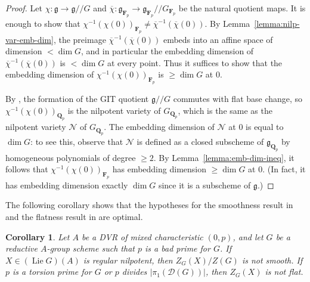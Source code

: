 \documentclass[11pt,reqno]{amsart}
\newtheorem{cor}[theorem]{Corollary}
\theoremstyle{definition}
\newcommand{\bF}{{\mathbf F}}
\newcommand{\bQ}{{\mathbf Q}}
\newcommand{\sD}{{\mathscr D}}
\newcommand{\sN}{{\mathscr N}}
\newcommand{\fg}{\mathfrak{g}}
\DeclareMathOperator{\Lie}{Lie}
\begin{document}
\begin{proof}
    Let $\chi\colon \fg \to \fg/\!/G$ and $\overline{\chi}\colon \fg_{\bF_p} \to \fg_{\bF_p}/\!/G_{\bF_p}$ be the natural quotient maps. It is enough to show that $\chi^{-1}(\chi(0))_{\bF_p} \neq \overline{\chi}^{-1}(\overline{\chi}(0))$. By Lemma~\ref{lemma:nilp-var-emb-dim}, the preimage $\overline{\chi}^{-1}(\overline{\chi}(0))$ embeds into an affine space of dimension $< \dim G$, and in particular the embedding dimension of $\overline{\chi}^{-1}(\overline{\chi}(0))$ is $< \dim G$ at every point. Thus it suffices to show that the embedding dimension of $\chi^{-1}(\chi(0))_{\bF_p}$ is $\geq \dim G$ at $0$.

    By \cite[Proposition 5.2.9, Theorem 9.1.4]{Alper-adequate}, the formation of the GIT quotient $\fg/\!/G$ commutes with flat base change, so $\chi^{-1}(\chi(0))_{\bQ_p}$ is the nilpotent variety of $G_{\bQ_p}$, which is the same as the nilpotent variety $\sN$ of $G_{\bQ_p}$. The embedding dimension of $\sN$ at $0$ is equal to $\dim G$: to see this, observe that $\sN$ is defined as a closed subscheme of $\fg_{\bQ_p}$ by homogeneous polynomials of degree $\geq 2$. By Lemma~\ref{lemma:emb-dim-ineq}, it follows that $\chi^{-1}(\chi(0))_{\bF_p}$ has embedding dimension $\geq \dim G$ at $0$. (In fact, it has embedding dimension exactly $\dim G$ since it is a subscheme of $\fg$.)
\end{proof}

The following corollary shows that the hypotheses for the smoothness result in \cite[Theorem 3.10(2)]{Integral-Springer} and the flatness result in \cite[Theorem 4.2.8]{Bouthier-Cesnavicius} are optimal.

\begin{cor}\label{cor:non-flat-nilp}
Let $A$ be a DVR of mixed characteristic $(0, p)$, and let $G$ be a reductive $A$-group scheme such that $p$ is a bad prime for $G$. If $X \in (\Lie G)(A)$ is regular nilpotent, then $Z_G(X)/Z(G)$ is not smooth. If $p$ is a torsion prime for $G$ or $p$ divides $|\pi_1(\sD(G))|$, then $Z_G(X)$ is not flat.
\end{cor}
\end{document}
